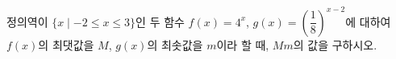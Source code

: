정의역이 $\{x \mid -2\le x\le 3\}$인 두 함수 $f(x)=4^x$, $g(x)=\left(\dfrac{1}{8}\right)^{x-2}$에 대하여 $f(x)$의 최댓값을 $M$, $g(x)$의 최솟값을 $m$이라 할 때, $Mm$의 값을 구하시오.
